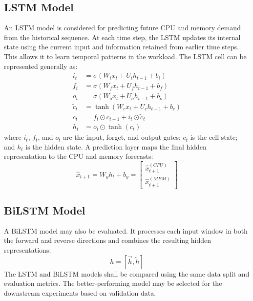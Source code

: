 \documentclass[12pt,a4paper]{report}
\begin{document}
\subsection{LSTM Model}
An LSTM model is considered for predicting future CPU and memory demand from the historical sequence. At each time step, the LSTM updates its internal state using the current input and information retained from earlier time steps. This allows it to learn temporal patterns in the workload.
The LSTM cell can be represented generally as:
\begin{align}
i_{t} &= \sigma(W_{i}x_{t} + U_{i}h_{t-1} + b_{i}) \\
f_{t} &= \sigma(W_{f}x_{t} + U_{f}h_{t-1} + b_{f}) \\
o_{t} &= \sigma(W_{o}x_{t} + U_{o}h_{t-1} + b_{o}) \\
\tilde{c}_{t} &= \tanh(W_{c}x_{t} + U_{c}h_{t-1} + b_{c}) \\
c_{t} &= f_{t} \odot c_{t-1} + i_{t} \odot \tilde{c}_{t} \\
h_{t} &= o_{t} \odot \tanh(c_{t})
\end{align}
where $i_{t}$, $f_{t}$, and $o_{t}$ are the input, forget, and output gates; $c_{t}$ is the cell state; and $h_{t}$ is the hidden state.
A prediction layer maps the final hidden representation to the CPU and memory forecasts:
\begin{equation}
\hat{x}_{t+1} = W_{y}h_{t} + b_{y} = \begin{bmatrix} \hat{x}_{t+1}^{(CPU)} \\ \hat{x}_{t+1}^{(MEM)} \end{bmatrix}
\end{equation}

\subsection{BiLSTM Model}
A BiLSTM model may also be evaluated. It processes each input window in both the forward and reverse directions and combines the resulting hidden representations:
\begin{equation}
h = [\vec{h}, \overleftarrow{h}]
\end{equation}
The LSTM and BiLSTM models shall be compared using the same data split and evaluation metrics. The better-performing model may be selected for the downstream experiments based on validation data.
\lipsum[50-52]
\end{document}
